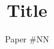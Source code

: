 \documentclass[10pt,twocolumn,letterpaper]{article}
\begin{document}
\date{}
\title{Title}
\author{Paper \#NN}
\maketitle

\begin{abstract}
  
\end{abstract}


%
%
\end{document}
